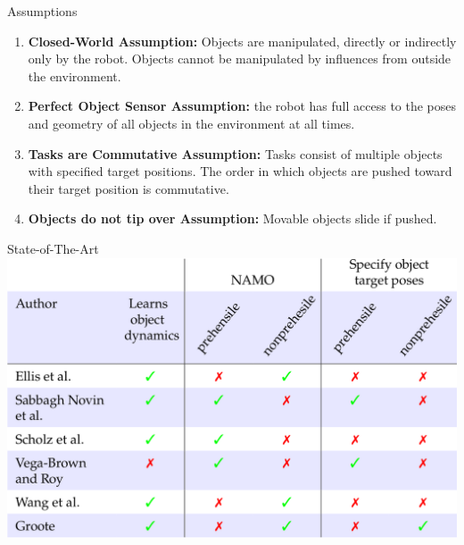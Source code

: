 \begin{frame}[fragile]{Assumptions}
\begin{block}{}
\begin{enumerate}
  \item \textbf{Closed-World Assumption:} Objects are manipulated, directly or indirectly only by the robot. Objects cannot be manipulated by influences from outside the environment.\\
\item\textbf{Perfect Object Sensor Assumption:} the robot has full access to the poses and geometry of all objects in the environment at all times.\\
\item\textbf{Tasks are Commutative Assumption:} Tasks consist of multiple objects with specified target positions. The order in which objects are pushed toward their target position is commutative.\\
\item\textbf{Objects do not tip over Assumption:} Movable objects slide if pushed.\\
\end{enumerate}
\end{block}
\end{frame}


\begin{frame}[fragile]{State-of-The-Art}
  \includegraphics[width=1.0\textwidth]{figures/introduction/sota}

\end{frame}



